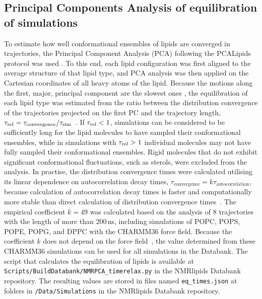 \documentclass[fleqn,10pt]{wlscirep}
\begin{document}
\subsection{Principal Components Analysis of equilibration of simulations}
To estimate how well conformational ensembles of lipids are converged in trajectories, the Principal Component Analysis (PCA) following the PCALipids protocol was used \cite{buslaev16,buslaev2020principal}. 
To this end, each lipid configuration was first aligned to the average structure of that lipid type, and PCA analysis was then applied on the Cartesian coordinates of all heavy atoms of the lipid. Because the motions along the first, major, principal component are the slowest ones \cite{buslaev16}, the equilibration of each lipid type was estimated from the ratio between the distribution convergence of the trajectories projected on the first PC and the trajectory length, $\tau_{\rm rel} = \tau_{\text{convergence}}/\tau_{\text{sim}}$~\cite{buslaev16, buslaev2020principal}. If $\tau_{\rm rel} < 1$, simulations can be considered to be sufficiently long for the lipid molecules to have sampled their conformational ensembles, while in simulations with $\tau_{\rm rel} > 1$ individual molecules may not have fully sampled their conformational ensembles. Rigid molecules that do not exhibit significant conformational fluctuations, such as sterols, were excluded from the analysis. 
In practise, the distribution convergence times were calculated utilising its linear dependence on autocorrelation decay times,
    $\tau_{\text{convergence}} = k\tau_{\text{autocorrelation}}$,
because calculation of autocorrelation decay times is faster and computationally more stable than direct calculation of distribution convergence times~\cite{buslaev16, buslaev2020principal}. The empirical coefficient $k = 49$ was calculated based on the analysis of 8 trajectories with the length of more than 200\,ns, including simulations of POPC, POPS, POPE, POPG, and DPPC with the CHARMM36 force field. %
Because the coefficient $k$ does not depend on the force field~\cite{buslaev16}, the value determined from these CHARMM36 simulations can be used for all simulations in the Databank. The script that calculates the equilibration of lipids is available at \texttt{Scripts/BuildDatabank/NMRPCA\_timerelax.py} in the NMRlipids Databank repository. The resulting values are stored in files named \texttt{eq\_times.json} at folders in \texttt{/Data/Simulations} in the NMRlipids Databank repository. 
\end{document}
